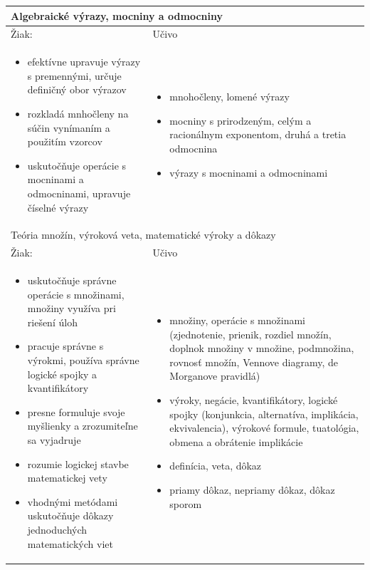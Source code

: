 \documentclass[11pt,a4paper,oneside,final]{book}
\begin{document}
\begin{tabularx}{\textwidth}{X X}
\hline
\multicolumn{2}{p{\textwidth}}{Algebraické výrazy, mocniny a odmocniny} \\
\hline
Žiak: & Učivo \\ \begin{itemize} \item efektívne upravuje výrazy s premennými, určuje definičný obor výrazov
\item rozkladá mnhočleny na súčin vynímaním a použitím vzorcov
\item uskutočňuje operácie s mocninami a odmocninami, upravuje číselné výrazy \end{itemize} & \begin{itemize}
\item mnohočleny, lomené výrazy
\item mocniny s prirodzeným, celým a racionálnym exponentom, druhá a tretia odmocnina
\item výrazy s mocninami a odmocninami
\end{itemize} \\
\hline
\multicolumn{2}{p{\textwidth}}{Teória množín, výroková veta, matematické výroky a dôkazy} \\
\hline
Žiak: & Učivo\\
\begin{itemize}
\item uskutočňuje správne operácie s množinami, množiny využíva pri riešení úloh
\item pracuje správne s výrokmi, používa správne logické spojky a kvantifikátory
\item presne formuluje svoje myšlienky a zrozumiteľne sa vyjadruje
\item rozumie logickej stavbe matematickej vety
\item vhodnými metódami uskutočňuje dôkazy jednoduchých matematických viet
\end{itemize} &
\begin{itemize}
\item množiny, operácie s množinami (zjednotenie, prienik, rozdiel množín, doplnok množiny v množine, podmnožina, rovnosť množín, Vennove diagramy, de Morganove pravidlá)
\item výroky, negácie, kvantifikátory, logické spojky (konjunkcia, alternatíva, implikácia, ekvivalencia), výrokové formule, tuatológia, obmena a obrátenie implikácie
\item definícia, veta, dôkaz
\item priamy dôkaz, nepriamy dôkaz, dôkaz sporom

\end{itemize}
\end{tabularx}
\end{document}
